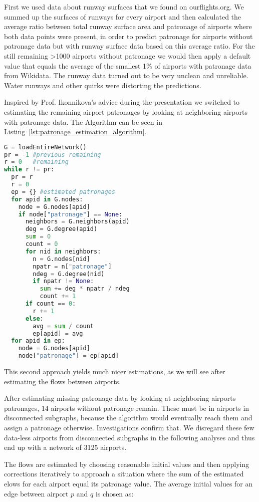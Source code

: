 \documentclass[twocolumn]{tum-article}
\begin{document}
First we used data about runway surfaces that we found on ourflights.org. 
We summed up the surfaces of runways for every airport and then calculated the average ratio between total runway surface area and patronage of airports where both data points were present, in order to predict patronage for airports without patronage data but with runway surface data based on this average ratio. 
For the still remaining >1000 airports without patronage we would then apply a default value that equals the average of the smallest 1\% of airports with patronage data from Wikidata. 
The runway data turned out to be very unclean and unreliable. Water runways and other quirks were distorting the predictions. 

Inspired by Prof. Ikonnikova's advice during the presentation we switched to estimating the remaining airport patronages by looking at neighboring airports with patronage data. The Algorithm can be seen in Listing~\ref{lst:patronage_estimation_algorithm}.
\begin{lstlisting}[language=Python, caption={Patronage estimation algorithm, that uses neighboring airport's patronage data}, label=lst:patronage_estimation_algorithm]
G = loadEntireNetwork()
pr = -1 #previous remaining
r = 0   #remaining
while r != pr:
  pr = r
  r = 0
  ep = {} #estimated patronages
  for apid in G.nodes:
    node = G.nodes[apid]
    if node["patronage"] == None:
      neighbors = G.neighbors(apid) 
      deg = G.degree(apid)
      sum = 0
      count = 0
      for nid in neighbors: 
        n = G.nodes[nid]
        npatr = n["patronage"]
        ndeg = G.degree(nid) 
        if npatr != None: 
          sum += deg * npatr / ndeg
          count += 1
      if count == 0:
        r += 1
      else:
        avg = sum / count
        ep[apid] = avg 
  for apid in ep: 
    node = G.nodes[apid]
    node["patronage"] = ep[apid]
\end{lstlisting}
This second approach yields much nicer estimations, as we will see after estimating the flows between airports. 

After estimating missing patronage data by looking at neighboring airports patronages, 14 airports without patronage remain. These must be in airports in disconnected subgraphs, because the algorithm would eventually reach them and assign a patronage otherwise. Investigations confirm that. We disregard these few data-less airports from disconnected subgraphs in the following analyses and thus end up with a network of 3125 airports. 

The flows are estimated by choosing reasonable initial values and then applying corrections iteratively to approach a situation where the sum of the estimated elows for each airport equal its patronage value.
The average initial values for an edge between airport $p$ and $q$ is chosen as: 
\end{document}
